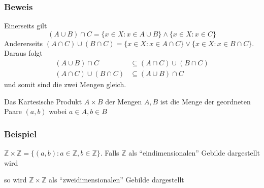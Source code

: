 \subsubsection*{Beweis}
Einerseits gilt
\[
(A \cup B) \cap C = \{x \in X: x \in A \cup B \} \land \{ x \in X: x \in C\}
\]
Andererseits $(A \cap C) \cup ( B \cap C) = \{ x \in X: x \in A \cap C \} \lor \{ x \in X : x \in B \cap C \}$. Daraus folgt
\begin{align*}
(A \cup B ) \cap C &\subseteq (A \cap C) \cup (B \cap C) \\
(A \cap C ) \cup (B \cap C) &\subseteq (A \cup B) \cap C
\end{align*}
und somit sind die zwei Mengen gleich.

\begin{definition}{1.7}
Das Kartesische Produkt $A\times B$ der Mengen $A,B$ ist die Menge der geordneten Paare $(a,b)$ wobei $a\in A, b\in B$
\end{definition}

\subsubsection*{Beispiel}
$\mathbb{Z}\times\mathbb{Z}=\{(a,b):a\in\mathbb{Z},b\in\mathbb{Z}\}$. Falls $\mathbb{Z}$ als ``eindimensionalen'' Gebilde dargestellt wird 

\begin{center}
\end{center}


so wird $\mathbb{Z}\times\mathbb{Z}$ als ``zweidimensionalen'' Gebilde dargestellt 

